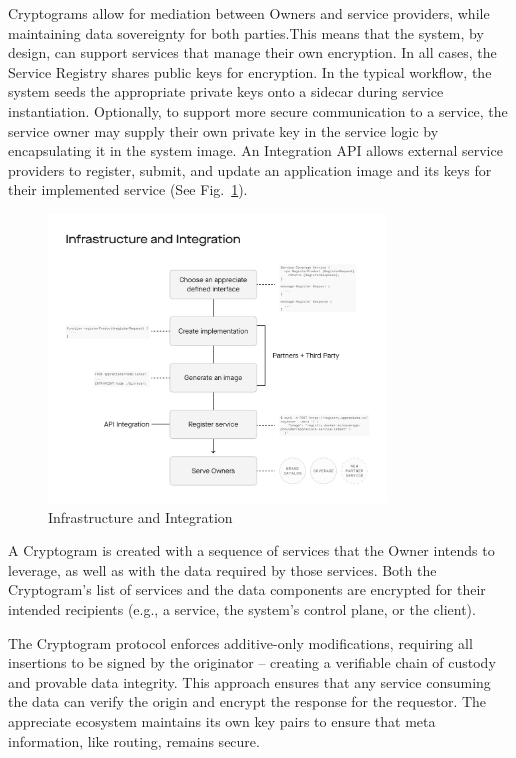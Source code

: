 \documentclass[a4paper,onecolumn, 10.5pt]{article}
\begin{document}
Cryptograms allow for mediation between Owners and service providers, while maintaining data sovereignty for both parties.This means that the system, by design, can support services that manage their own encryption. In all cases, the Service Registry shares public keys for encryption. In the typical workflow, the system seeds the appropriate private keys onto a sidecar during service instantiation. Optionally, to support more secure communication to a service, the service owner may supply their own private key in the service logic by encapsulating it in the system image. An Integration API allows external service providers to register, submit, and update an application image and its keys for their implemented service (See Fig.~\ref{fig: infraint}).

\begin{figure}[!htb]
	\centering %
		\includegraphics[clip, trim=0cm 2cm 0cm 5cm, width=0.80\textwidth]{./images/Infrasctructure_and_integration.pdf}
	\caption{Infrastructure and Integration}
	\label{fig: infraint}
\end{figure}


A Cryptogram is created with a sequence of services that the Owner intends to leverage, as well as with the data required by those services. Both the Cryptogram’s list of services and the data components are encrypted for their intended recipients (e.g., a service, the system’s control plane, or the client).

The Cryptogram protocol enforces additive-only modifications, requiring all insertions to be signed by the originator -- creating a verifiable chain of custody and provable data integrity. This approach ensures that any service consuming the data can verify the origin and encrypt the response for the requestor. The appreciate ecosystem maintains its own key pairs to ensure that meta information, like routing, remains secure.
\end{document}
